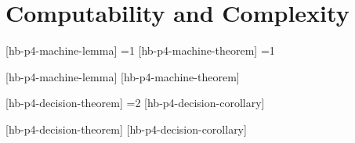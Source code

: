\part{Computability and Complexity}\label{part:p04}



\setcounter{hbsourcep4result}{0}
[hb-p4-machine-lemma]{%
  \ifnum\value{hbsourcep4result}=1
    \label{thm:machine-decidability}%
  \fi}
[hb-p4-machine-theorem]{%
  \ifnum\value{hbsourcep4result}=1
    \label{thm:ce-equivalent-forms}%
    \setcounter{hbsourcep4result}{2}%
  \fi}

[hb-p4-machine-lemma]
[hb-p4-machine-theorem]









\setcounter{hbsourcep4result}{0}
[hb-p4-decision-theorem]{%
  \ifnum\value{hbsourcep4result}=2
    \label{thm:trakhtenbrot}%
  \fi}
[hb-p4-decision-corollary]{%
  \label{thm:fol-validity-enumerable}}

[hb-p4-decision-theorem]
[hb-p4-decision-corollary]
